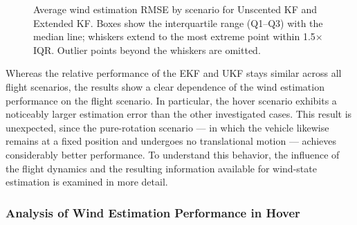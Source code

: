 \begin{figure}[htbp]
	\caption{Average wind estimation RMSE by scenario for Unscented KF and Extended KF. Boxes show the interquartile range (Q1--Q3) with the median line; whiskers extend to the most extreme point within 1.5$\times$IQR. Outlier points beyond the whiskers are omitted.}
	\label{fig:EKFvsUKF_scenarios}
\end{figure}

Whereas the relative performance of the EKF and UKF stays similar across all flight scenarios, the results show a clear dependence of the wind estimation performance on the flight scenario. In particular, the hover scenario exhibits a noticeably larger estimation error than the other investigated cases. This result is unexpected, since the pure-rotation scenario — in which the vehicle likewise remains at a fixed position and undergoes no translational motion — achieves considerably better performance. To understand this behavior, the influence of the flight dynamics and the resulting information available for wind-state estimation is examined in more detail.





\subsubsection{Analysis of Wind Estimation Performance in Hover}


